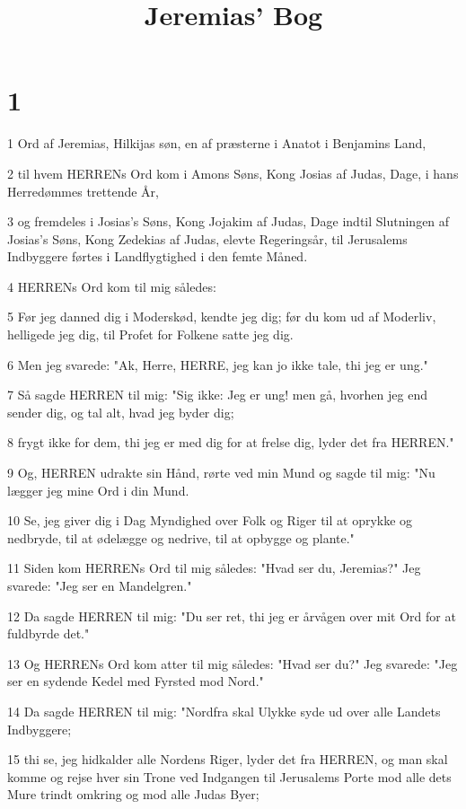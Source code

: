 

\title{Jeremias' Bog}


\chapter{1}

\par 1 Ord af Jeremias, Hilkijas søn, en af præsterne i Anatot i Benjamins Land,
\par 2 til hvem HERRENs Ord kom i Amons Søns, Kong Josias af Judas, Dage, i hans Herredømmes trettende År,
\par 3 og fremdeles i Josias's Søns, Kong Jojakim af Judas, Dage indtil Slutningen af Josias's Søns, Kong Zedekias af Judas, elevte Regeringsår, til Jerusalems Indbyggere førtes i Landflygtighed i den femte Måned.
\par 4 HERRENs Ord kom til mig således:
\par 5 Før jeg danned dig i Moderskød, kendte jeg dig; før du kom ud af Moderliv, helligede jeg dig, til Profet for Folkene satte jeg dig.
\par 6 Men jeg svarede: "Ak, Herre, HERRE, jeg kan jo ikke tale, thi jeg er ung."
\par 7 Så sagde HERREN til mig: "Sig ikke: Jeg er ung! men gå, hvorhen jeg end sender dig, og tal alt, hvad jeg byder dig;
\par 8 frygt ikke for dem, thi jeg er med dig for at frelse dig, lyder det fra HERREN."
\par 9 Og, HERREN udrakte sin Hånd, rørte ved min Mund og sagde til mig: "Nu lægger jeg mine Ord i din Mund.
\par 10 Se, jeg giver dig i Dag Myndighed over Folk og Riger til at oprykke og nedbryde, til at ødelægge og nedrive, til at opbygge og plante."
\par 11 Siden kom HERRENs Ord til mig således: "Hvad ser du, Jeremias?" Jeg svarede: "Jeg ser en Mandelgren."
\par 12 Da sagde HERREN til mig: "Du ser ret, thi jeg er årvågen over mit Ord for at fuldbyrde det."
\par 13 Og HERRENs Ord kom atter til mig således: "Hvad ser du?" Jeg svarede: "Jeg ser en sydende Kedel med Fyrsted mod Nord."
\par 14 Da sagde HERREN til mig: "Nordfra skal Ulykke syde ud over alle Landets Indbyggere;
\par 15 thi se, jeg hidkalder alle Nordens Riger, lyder det fra HERREN, og man skal komme og rejse hver sin Trone ved Indgangen til Jerusalems Porte mod alle dets Mure trindt omkring og mod alle Judas Byer;
